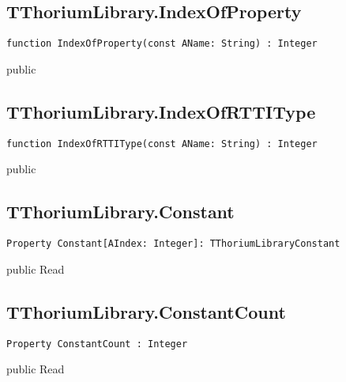 \subsection{TThoriumLibrary.IndexOfProperty}
\label{thoriumcorepkg:thorium:tthoriumlibrary:indexofproperty}
\begin{FPCList}
\Declaration 

\begin{verbatim}
function IndexOfProperty(const AName: String) : Integer
\end{verbatim}
\Visibility
public
\end{FPCList}
\subsection{TThoriumLibrary.IndexOfRTTIType}
\label{thoriumcorepkg:thorium:tthoriumlibrary:indexofrttitype}
\begin{FPCList}
\Declaration 

\begin{verbatim}
function IndexOfRTTIType(const AName: String) : Integer
\end{verbatim}
\Visibility
public
\end{FPCList}
\subsection{TThoriumLibrary.Constant}
\label{thoriumcorepkg:thorium:tthoriumlibrary:constant}
\begin{FPCList}
\Declaration 

\begin{verbatim}
Property Constant[AIndex: Integer]: TThoriumLibraryConstant
\end{verbatim}
\Visibility
public
\Access
Read
\end{FPCList}
\subsection{TThoriumLibrary.ConstantCount}
\label{thoriumcorepkg:thorium:tthoriumlibrary:constantcount}
\begin{FPCList}
\Declaration 

\begin{verbatim}
Property ConstantCount : Integer
\end{verbatim}
\Visibility
public
\Access
Read
\end{FPCList}
